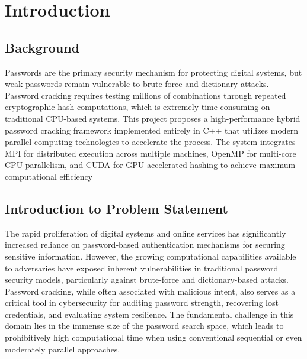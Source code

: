 \documentclass[12pt,a4paper]{article}
\begin{document}
	
	\renewcommand*\contentsname{Table of Contents}
	\tableofcontents
	\newpage
	\newpage
    \listoffigures
    \newpage
    \newpage
    \listoftables
    \newpage
   
    \section{Introduction}



	\subsection{Background}
		Passwords are the primary security mechanism for protecting digital systems, but weak passwords remain vulnerable to brute force and dictionary attacks. Password cracking requires testing millions of combinations through repeated cryptographic hash computations, which is extremely time-consuming on traditional CPU-based systems. This project proposes a high-performance hybrid password cracking framework implemented entirely in C++ that utilizes modern parallel computing technologies to accelerate the process. The system integrates MPI for distributed execution across multiple machines, OpenMP for multi-core CPU parallelism, and CUDA for GPU-accelerated hashing to achieve maximum computational efficiency
        
		\subsection{Introduction to Problem Statement}
        The rapid proliferation of digital systems and online services has significantly increased reliance on password-based authentication mechanisms for securing sensitive information. However, the growing computational capabilities available to adversaries have exposed inherent vulnerabilities in traditional password security models, particularly against brute-force and dictionary-based attacks. Password cracking, while often associated with malicious intent, also serves as a critical tool in cybersecurity for auditing password strength, recovering lost credentials, and evaluating system resilience. The fundamental challenge in this domain lies in the immense size of the password search space, which leads to prohibitively high computational time when using conventional sequential or even moderately parallel approaches.
    
\end{document}
